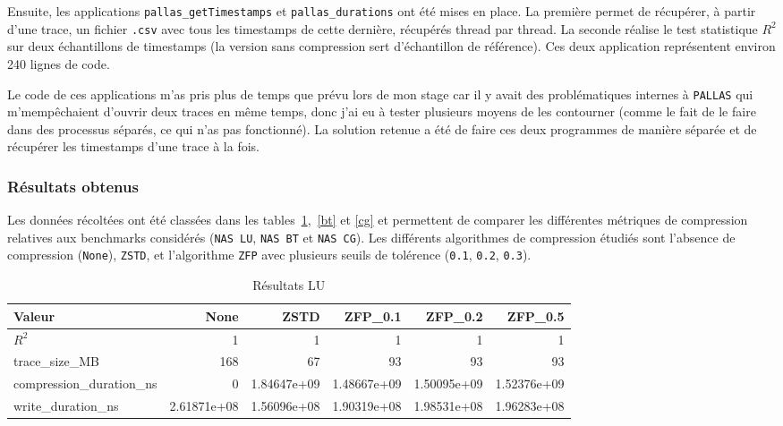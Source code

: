 Ensuite, les applications \verb!pallas_getTimestamps! et \verb!pallas_durations! ont été mises en place. La première permet de récupérer, à partir d'une trace, un fichier \verb!.csv! avec 
tous les timestamps de cette dernière, récupérés thread par thread. La seconde réalise le test statistique $R^2$ sur deux échantillons de timestamps (la version sans compression sert d'échantillon
de référence). Ces deux application représentent environ 240 lignes de code.

Le code de ces applications m'as pris plus de temps que prévu lors de mon stage car il y avait des problématiques internes à \verb!PALLAS! qui m'mempêchaient d'ouvrir deux 
traces en même temps, donc j'ai eu à tester plusieurs moyens de les contourner (comme le fait de le faire dans des processus séparés, ce qui n'as pas fonctionné).
La solution retenue a été de faire ces deux programmes de manière séparée et de récupérer les timestamps d'une trace à la fois.

\subsubsection{Résultats obtenus}\label{ssec:comp_res}

Les données récoltées ont été classées dans les tables~\ref{lu},~\ref{bt} et \ref{cg} et permettent de comparer les différentes métriques de compression relatives aux benchmarks considérés
(\verb!NAS LU!, \verb!NAS BT! et \verb!NAS CG!).
Les différents algorithmes de compression étudiés sont l'absence de compression (\verb!None!), \verb!ZSTD!, et l'algorithme \verb!ZFP! avec plusieurs seuils de tolérence 
(\verb!0.1!, \verb!0.2!, \verb!0.3!).

\begin{table}[h]
\centering
\caption{Résultats LU}\label{lu}
\begin{adjustbox}{max width=\linewidth}
\begin{tabular}{lrrrrr}
\hline
\textbf{Valeur} & \textbf{None} & \textbf{ZSTD} & \textbf{ZFP\_0.1} & \textbf{ZFP\_0.2} & \textbf{ZFP\_0.5} \\
\hline
$R^2$                     & 1            & 1            & 1             & 1             & 1 \\
trace\_size\_MB           & 168          & 67           & 93            & 93            & 93 \\
compression\_duration\_ns & 0            & 1.84647e+09  & 1.48667e+09   & 1.50095e+09   & 1.52376e+09 \\
write\_duration\_ns       & 2.61871e+08  & 1.56096e+08  & 1.90319e+08   & 1.98531e+08   & 1.96283e+08 \\
\hline
\end{tabular}
\end{adjustbox}
\end{table}


